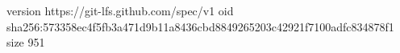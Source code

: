 version https://git-lfs.github.com/spec/v1
oid sha256:573358ec4f5fb3a471d9b11a8436cbd8849265203c42921f7100adfc834878f1
size 951
